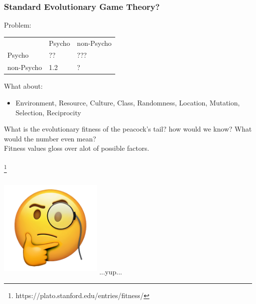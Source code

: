 \documentclass{beamer}
\newcommand\blfootnote[1]{%
  \begingroup
  \renewcommand\thefootnote{}\footnote{#1}%
  \addtocounter{footnote}{-1}%
  \endgroup
}
\begin{document}
\begin{frame}
\frametitle{Standard Evolutionary Game Theory?}
Problem:
\begin{table}[]
\begin{tabular}{lll}
                                & Psycho                   & non-Psycho               \\ \cline{2-3} 
\multicolumn{1}{l|}{Psycho}     & \multicolumn{1}{l|}{??}  & \multicolumn{1}{l|}{???} \\ \cline{2-3} 
\multicolumn{1}{l|}{non-Psycho} & \multicolumn{1}{l|}{1.2} & \multicolumn{1}{l|}{?}   \\ \cline{2-3} 
\end{tabular}
\end{table}
What about:
\begin{itemize}
    \item Environment, Resource, Culture, Class, Randomness, Location, Mutation, Selection, Reciprocity
\end{itemize}
What is the evolutionary fitness of the peacock's tail?
how would we know? What would the number even mean?\-\\
Fitness values gloss over alot of possible factors.\\ \-\\
\blfootnote{https://plato.stanford.edu/entries/fitness/}
\end{frame}






\begin{frame}
\includegraphics[width=5cm,height=5cm]{thinking_emoji.png}
...yup...
\end{frame}
\end{document}
